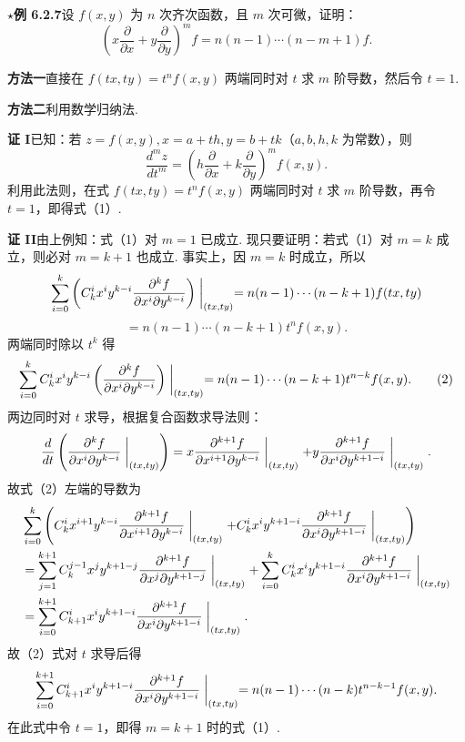\documentclass[UTF8, 12pt, fontset=fandol, oneside]{ctexart}
\begin{document}
\noindent\textbf{\ensuremath{\star}例 6.2.7}\quad 设 $f(x,y)$ 为 $n$ 次齐次函数，且 $m$ 次可微，证明：
\[
  \left(x\frac{\partial}{\partial x}+y\frac{\partial}{\partial y}\right)^m f
  =n(n-1)\cdots(n-m+1)f. \tag{1}
\]

\textbf{方法一}\quad 直接在 $f(tx,ty)=t^nf(x,y)$ 两端同时对 $t$ 求 $m$ 阶导数，然后令 $t=1$.

\textbf{方法二}\quad 利用数学归纳法.

\noindent\textbf{证 I}\quad 已知：若 $z=f(x,y),x=a+th,y=b+tk$（$a,b,h,k$ 为常数），则
\[
  \frac{d^mz}{dt^m}=\left(h\frac{\partial}{\partial x}+k\frac{\partial}{\partial y}\right)^m f(x,y).
\]
利用此法则，在式 $f(tx,ty)=t^nf(x,y)$ 两端同时对 $t$ 求 $m$ 阶导数，再令 $t=1$，即得式（1）.

\noindent\textbf{证 II}\quad 由上例知：式（1）对 $m=1$ 已成立. 现只要证明：若式（1）对 $m=k$ 成立，则必对 $m=k+1$ 也成立. 事实上，因 $m=k$ 时成立，所以
\[
  \sum_{i=0}^k\left(C_k^i x^i y^{k-i}\frac{\partial^k f}{\partial x^i\partial y^{k-i}}\right)\biggm|_{(tx,ty)}
  =n(n-1)\cdots(n-k+1)f(tx,ty)
\]
\[
  =n(n-1)\cdots(n-k+1)t^nf(x,y).
\]
两端同时除以 $t^k$ 得
\[
  \sum_{i=0}^k C_k^i x^i y^{k-i}
  \left(\frac{\partial^k f}{\partial x^i\partial y^{k-i}}\right)\biggm|_{(tx,ty)}
  =n(n-1)\cdots(n-k+1)t^{n-k}f(x,y). \tag{2}
\]
两边同时对 $t$ 求导，根据复合函数求导法则：
\[
  \frac{d}{dt}\left(\frac{\partial^k f}{\partial x^i\partial y^{k-i}}\biggm|_{(tx,ty)}\right)
  =x\frac{\partial^{k+1}f}{\partial x^{i+1}\partial y^{k-i}}\biggm|_{(tx,ty)}
  +y\frac{\partial^{k+1}f}{\partial x^i\partial y^{k+1-i}}\biggm|_{(tx,ty)}.
\]
故式（2）左端的导数为
\[
\begin{aligned}
  &\sum_{i=0}^k\left(
  C_k^i x^{i+1}y^{k-i}\frac{\partial^{k+1}f}{\partial x^{i+1}\partial y^{k-i}}\biggm|_{(tx,ty)}
  +C_k^i x^iy^{k+1-i}\frac{\partial^{k+1}f}{\partial x^i\partial y^{k+1-i}}\biggm|_{(tx,ty)}
  \right)\\
  &=\sum_{j=1}^{k+1}C_k^{j-1}x^jy^{k+1-j}\frac{\partial^{k+1}f}{\partial x^j\partial y^{k+1-j}}\biggm|_{(tx,ty)}
  +\sum_{i=0}^k C_k^i x^iy^{k+1-i}\frac{\partial^{k+1}f}{\partial x^i\partial y^{k+1-i}}\biggm|_{(tx,ty)}\\
  &=\sum_{i=0}^{k+1}C_{k+1}^i x^iy^{k+1-i}
  \frac{\partial^{k+1}f}{\partial x^i\partial y^{k+1-i}}\biggm|_{(tx,ty)}.
\end{aligned}
\]
故（2）式对 $t$ 求导后得
\[
  \sum_{i=0}^{k+1}C_{k+1}^i x^iy^{k+1-i}
  \frac{\partial^{k+1}f}{\partial x^i\partial y^{k+1-i}}\biggm|_{(tx,ty)}
  =n(n-1)\cdots(n-k)t^{n-k-1}f(x,y).
\]
在此式中令 $t=1$，即得 $m=k+1$ 时的式（1）.
\end{document}
